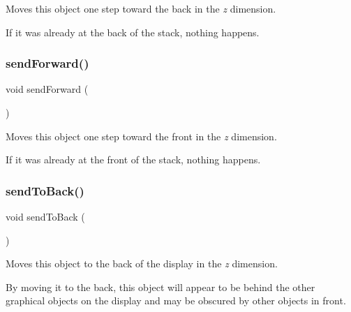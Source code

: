 Moves this object one step toward the back in the {\itshape z} dimension. 

If it was already at the back of the stack, nothing happens. \mbox{\label{classsgl_1_1GObject_a710b3e449c9facba7847c91ab170d281}} 
\subsubsection{\texorpdfstring{send\+Forward()}{sendForward()}}
{\footnotesize\ttfamily void send\+Forward (\begin{DoxyParamCaption}{ }\end{DoxyParamCaption})\hspace{0.3cm}{\ttfamily [inherited]}}



Moves this object one step toward the front in the {\itshape z} dimension. 

If it was already at the front of the stack, nothing happens. \mbox{\label{classsgl_1_1GObject_a0f7f1efbb7fd46dde2867c4ad0330896}} 
\subsubsection{\texorpdfstring{send\+To\+Back()}{sendToBack()}}
{\footnotesize\ttfamily void send\+To\+Back (\begin{DoxyParamCaption}{ }\end{DoxyParamCaption})\hspace{0.3cm}{\ttfamily [inherited]}}



Moves this object to the back of the display in the {\itshape z} dimension. 

By moving it to the back, this object will appear to be behind the other graphical objects on the display and may be obscured by other objects in front. \mbox{\label{classsgl_1_1GObject_aee33d68488e46827ef55fac07f40a9b2}} 
